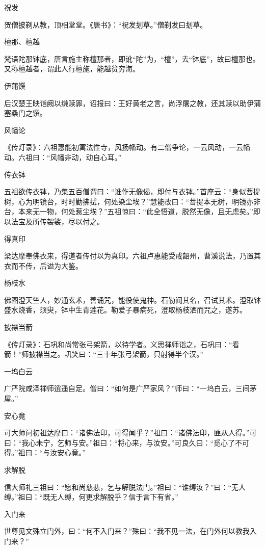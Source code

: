 \documentclass[a4paper,12pt,UTF8,twoside]{ctexbook}
\begin{document}
    祝发
    
    贺僧披剃从教，顶相堂堂。《唐书》：“祝发刬草。”僧剃发曰刬草。
    
    檀那、檀越
    
    梵语陀那钵底，唐言施主称檀那者，即讹“陀”为，“檀”，去“钵底”，故曰檀那也。又称檀越者，谓此人行檀施，能越贫穷海。
    
    伊蒲馔
    
    后汉楚王映诣阙以缣赎罪，诏报曰：王好黄老之言，尚浮屠之教，还其赎以助伊蒲塞桑门之馔。
    
    风幡论
    
    《传灯录》：六祖惠能初寓法性寺，风扬幡动。有二僧争论，一云风动，一云幡动。六祖曰：“风幡非动，动自心耳。”
    
    传衣钵
    
    五祖欲传衣钵，乃集五百僧谓曰：“谁作无像偈，即付与衣钵。”首座云：“身似菩提树，心为明镜台，时时勤拂拭，何处染尘埃？”慧能改曰：“菩提本无树，明镜亦非台，本来无一物，何处惹尘埃？”五祖惊曰：“此全悟道，脱然无像，且无虑矣。”即以法宝及所传袈裟，尽以付之。
    
    得真印
    
    梁达摩奉佛衣来，得道者传付以为真印。六祖卢惠能受戒韶州，曹溪说法，乃置其衣而不传，后谥为大鉴。
    
    杨枝水
    
    佛图澄天竺人，妙通玄术，善诵咒，能役使鬼神。石勒闻其名，召试其术。澄取钵盛水烧香，须臾，钵中生青莲花。勒爱子暴病死，澄取杨枝洒而咒之，遂苏。
    
    披襟当箭
    
    《传灯录》：石巩和尚常张弓架箭，以待学者。义思禅师诣之，石巩曰：“看箭！”师披襟当之。巩笑曰：“三十年张弓架箭，只射得半个汉。”
    
    一坞白云
    
    广严院咸泽禅师逍遥自足。僧曰：“如何是广严家风？”师曰：“一坞白云，三间茅屋。”
    
    安心竟
    
    可大师问初祖达摩曰：“诸佛法印，可得闻乎？”祖曰：“诸佛法印，匪从人得。”可曰：“我心未宁，乞师与安。”祖曰：“将心来，与汝安。”可良久曰：“觅心了不可得。”祖曰：“与汝安心竟。”
    
    求解脱
    
    信大师礼三祖曰：“愿和尚慈悲，乞与解脱法门。”祖曰：“谁缚汝？”曰：“无人缚。”祖曰：“既无人缚，何更求解脱乎？信于言下有省。”
    
    入门来
    
    世尊见文殊立门外，曰：“何不入门来？”殊曰：“我不见一法，在门外何以教我入门来？”
    
\end{document}

